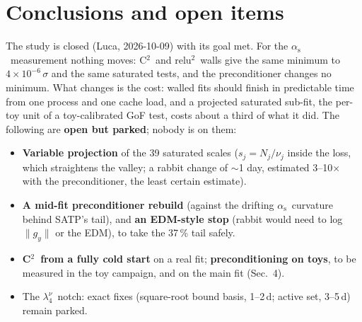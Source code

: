 \documentclass[10pt,a4paper]{article}
\newcommand\alphas{\ensuremath{\alpha_\mathrm{s}}}
\newcommand\lnu[1]{\ensuremath{\lambda_{#1}^{\nu}}}
\newcommand\fit[1]{\textsf{#1}}
\newcommand\relu{relu$^2$}
\newcommand\Ctwo{C$^2$}
\begin{document}
\section{Conclusions and open items}

The study is closed (Luca, 2026-10-09) with its goal met. For the \alphas\ measurement nothing moves: \Ctwo\ and \relu\
walls give the same minimum to $4\times10^{-6}\,\sigma$ and the same saturated tests, and the preconditioner changes no
minimum. What changes is the cost: walled fits should finish in predictable time from one process and one cache load, and
a projected saturated sub-fit, the per-toy unit of a toy-calibrated GoF test, costs about a third of what it did. The
following are \textbf{open but parked}; nobody is on them:
\begin{itemize}
  \item \textbf{Variable projection} of the 39 saturated scales ($s_j=N_j/\nu_j$ inside the loss, which straightens the
    valley; a rabbit change of $\sim$1 day, estimated 3--10$\times$ with the preconditioner, the least certain estimate).
  \item \textbf{A mid-fit preconditioner rebuild} (against the drifting \alphas\ curvature behind \fit{SATP}'s tail), and
    \textbf{an EDM-style stop} (rabbit would need to log $\|g_y\|$ or the EDM), to take the 37\,\% tail safely.
  \item \textbf{\Ctwo\ from a fully cold start} on a real fit; \textbf{preconditioning on toys}, to be measured in the toy
    campaign, and on the main fit (Sec.~4).
  \item The \lnu4\ notch: exact fixes (square-root bound basis, 1--2\,d; active set, 3--5\,d) remain parked.
\end{itemize}
\end{document}
